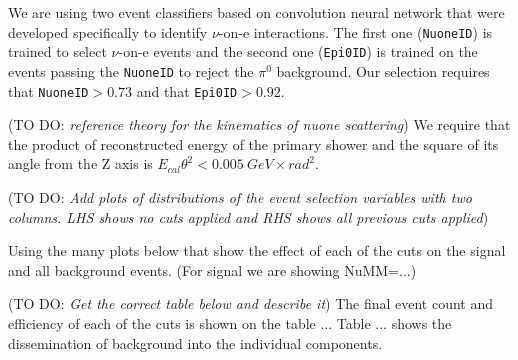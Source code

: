 \documentclass[12pt]{article}
\newcommand{\todo }[1]{({\color{red}\sc TO DO: \textit{#1}})}
\begin{document}
We are using two event classifiers based on convolution neural network that were developed specifically to identify $\nu$-on-e interactions. The first one (\texttt{NuoneID}) is trained to select $\nu$-on-e events and the second one (\texttt{Epi0ID}) is trained on the events passing the \texttt{NuoneID} to reject the $\pi^0$ background. Our selection requires that \texttt{NuoneID}$>0.73$ and that \texttt{Epi0ID}$>0.92$.

\todo{reference theory for the kinematics of nuone scattering}
We require that the product of reconstructed energy of the primary shower and the square of its angle from the Z axis is $E_{cal}\theta^2<0.005\ \unit{GeV\times rad^2}$.

\todo{Add plots of distributions of the event selection variables with two columns. LHS shows no cuts applied and RHS shows all previous cuts applied}

Using the many plots below that show the effect of each of the cuts on the signal and all background events. (For signal we are showing NuMM=...)

\todo{Get the correct table below and describe it}
The final event count and efficiency of each of the cuts is shown on the table ... Table ... shows the dissemination of background into the individual components.
\end{document}
